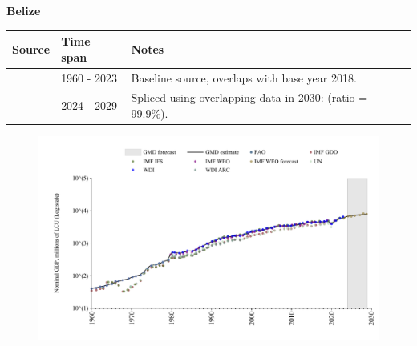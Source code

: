\documentclass[12pt,a4paper,landscape]{article}
\begin{document}
\begin{adjustbox}{max totalsize={\paperwidth}{\paperheight},center}
\begin{minipage}[t][\textheight][t]{\textwidth}
\vspace*{0.5cm}
{}
\begin{center}
{\Large\bfseries Belize}
\end{center}
\vspace{0.5cm}
\begin{table}[H]
\centering
\small
\begin{tabular}{|l|l|l|}
\hline
\textbf{Source} & \textbf{Time span} & \textbf{Notes} \\
\hline
\rowcolor{white}\cite{WDI}& 1960 - 2023 &Baseline source, overlaps with base year 2018.\\
\rowcolor{lightgray}\cite{IMF_WEO_forecast}& 2024 - 2029 &Spliced using overlapping data in 2030: (ratio = 99.9\%).\\
\hline
\end{tabular}
\end{table}
\begin{figure}[H]
\centering
\includegraphics[width=\textwidth,height=0.6\textheight,keepaspectratio]{graphs/BLZ_nGDP.pdf}
\end{figure}
\end{minipage}
\end{adjustbox}
\end{document}
